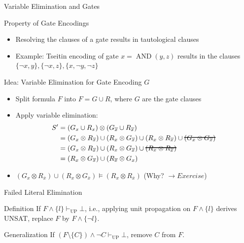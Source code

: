 \documentclass[t]{sdqbeamer}
\begin{document}
    
\begin{frame}{Variable Elimination and Gates}
\begin{block}{Property of Gate Encodings}
    \begin{itemize}
    \item Resolving the clauses of a gate results in tautological clauses
    \item Example: Tseitin encoding of gate $x = \mathop{AND}(y,z)$ results in the clauses $\{ \lnot x, y \}, \{ \lnot x, z \}, \{ x, \lnot y, \lnot z \}$
    \end{itemize}
\end{block}

\begin{block}{Idea: Variable Elimination for Gate Encoding $G$}
    \begin{itemize}
    \item Split formula $F$ into $F = G \cup R$, where $G$ are the gate clauses
    \item Apply variable elimination:\vspace*{-.7em}
    \begin{align*}
    S' &= (G_x \cup R_x) \otimes (G_{\overline x} \cup R_{\overline x})\\
       &= (G_x \otimes R_{\overline x}) \cup (R_x \otimes G_{\overline x}) \cup (R_x \otimes R_{\overline x}) \cup \hcancel{(G_x \otimes G_{\overline x})}\\
       &= (G_x \otimes R_{\overline x}) \cup (R_x \otimes G_{\overline x}) \cup \hcancel{(R_x \otimes R_{\overline x})}\\
       &= (R_x \otimes G_{\overline x}) \cup (R_{\overline x} \otimes G_x)
    \end{align*}\vspace*{-2em}%
    \item $(G_x \otimes R_{\overline x}) \cup (R_x \otimes G_{\overline x}) \models (R_x \otimes R_{\overline x})$ {\color{mypink} (Why? $\rightarrow Exercise$)}
    \end{itemize}
\end{block}
\end{frame}
    

\begin{frame}{Failed Literal Elimination}
\begin{block}{Definition}
If $F \land \{ l \} \vdash_{\mathop{UP}} \bot$, i.e., applying unit propagation on $F \land \{ l \}$ derives UNSAT, replace $F$ by $F \land \{ \lnot l\}$.
\end{block}
    
\begin{block}{Generalization} 
If $(F \setminus \{ C \}) \land \lnot C \vdash_{\mathop{UP}} \bot$, remove $C$ from $F$.
\end{block}
\end{frame}
\end{document}
